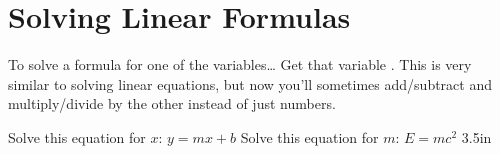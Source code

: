 \section{Solving Linear Formulas}

\begin{myConcept}{To solve a formula for one of the variables\dots} 
    Get that variable .
    This is very similar to solving linear equations, but now you'll 
    sometimes add/subtract and multiply/divide by the other  
    instead of just numbers.
\end{myConcept}


\myProblems
{
    Solve this equation for $x$:    $y = mx + b$
}
{
    Solve this equation for $m$:    $E = mc^2$
}
{3.5in}
